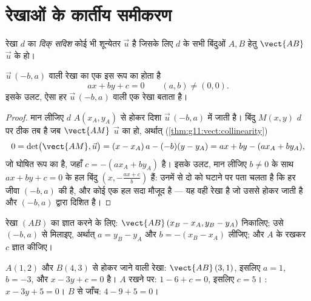 \section{रेखाओं के कार्तीय समीकरण}

\begin{definition}[दिक् सदिश]\label{def:g11:vect:direction}
रेखा $d$ का \emph{दिक् सदिश} कोई भी शून्येतर  $\vec u$ है
जिसके लिए $d$ के सभी बिंदुओं $A, B$ हेतु $\vect{AB}$ $\vec u$ के  हो।
\end{definition}

\begin{theorem}[कार्तीय समीकरण]\label{thm:g11:vect:cartesian}
 $\vec u\,(-b, a)$ वाली रेखा का एक  इस रूप का होता है
\[
ax + by + c = 0
\qquad (a, b) \neq (0, 0).
\]
इसके उलट, ऐसा हर   $\vec u\,(-b, a)$ वाली एक रेखा बताता है।
\end{theorem}

\begin{proof}
मान लीजिए $d$ $A(x_A, y_A)$ से होकर दिशा $\vec u\,(-b, a)$ में जाती है। बिंदु $M(x, y)$ $d$ पर ठीक तब
है जब $\vect{AM}$ $\vec u$ का  हो, अर्थात् (\cref{thm:g11:vect:collinearity})
\[
0 = \det\bigl(\vect{AM}, \vec u\bigr)
= (x - x_A)\,a - (-b)(y - y_A)
= ax + by - (a x_A + b y_A),
\]
जो घोषित रूप का  है, जहाँ $c = -(a x_A + b y_A)$ है। इसके उलट, मान लीजिए $b \neq 0$ के साथ
$ax + by + c = 0$ के हल बिंदु $\left(x, -\frac{a x + c}{b}\right)$ हैं: उनमें से दो को घटाने पर पता चलता है कि हर जीवा
$(-b, a)$ की  है, और कोई एक हल सदा मौजूद है --- यह वही रेखा है जो उससे होकर
जाती है और $(-b, a)$ द्वारा दिशित है।
\end{proof}

\begin{method}[दो बिंदुओं से जाने वाली रेखा]\label{met:g11:vect:twopoints}
रेखा $(AB)$ का  ज्ञात करने के लिए:  $\vect{AB}\,(x_B - x_A, y_B - y_A)$ निकालिए; उसे $(-b, a)$ से
मिलाइए, अर्थात् $a = y_B - y_A$ और $b = -(x_B - x_A)$ लीजिए; और $A$ के  रखकर $c$ ज्ञात
कीजिए।
\end{method}

\begin{example}\label{ex:g11:vect:twopoints}
$A(1, 2)$ और $B(4, 3)$ से होकर जाने वाली रेखा: $\vect{AB}\,(3, 1)$, इसलिए $a = 1$, $b = -3$, और 
$x - 3y + c = 0$ है। $A$ रखने पर: $1 - 6 + c = 0$, इसलिए $c = 5$। : $x - 3y + 5 = 0$। $B$ से जाँच:
$4 - 9 + 5 = 0$।
\end{example}

